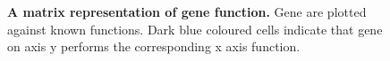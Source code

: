 \documentclass{article}
\begin{document}
\begin{figure}[H]
\centering
{}
\caption{\textbf{A matrix representation of gene function.} Gene are plotted against known functions. Dark blue coloured cells indicate that gene on axis y performs the corresponding x axis function.}
\label{sup_fig_2}
\end{figure}
\end{document}
